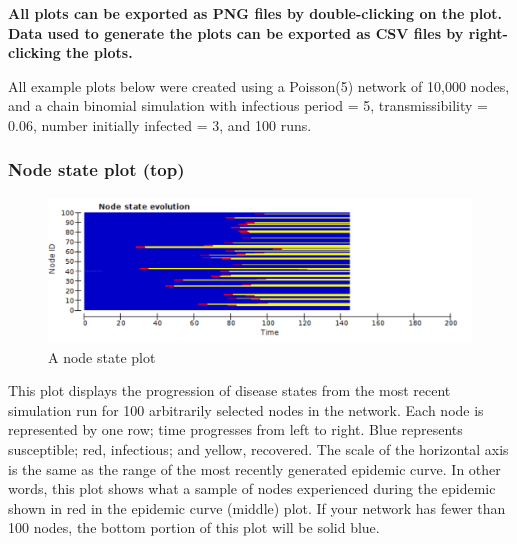 \documentclass{article}
\begin{document}
\textbf{All plots can be exported as PNG files by double-clicking on the plot.  Data used to generate the plots can be exported as CSV files by right-clicking the plots.}

All example plots below were created using a Poisson(5) network of 10,000 nodes, and a chain binomial simulation with infectious period = 5, transmissibility = 0.06, number initially infected = 3, and 100 runs.
\pagebreak
\subsubsection{Node state plot (top)}
\begin{figure}[h]
\begin{center}
\includegraphics[width = 6in]{states_example.pdf}
\caption{A node state plot}
\end{center}
\end{figure}
This plot displays the progression of disease states from the most recent simulation run for 100 arbitrarily selected nodes in the network. Each node is represented by one row; time progresses from left to right.  Blue represents susceptible; red, infectious; and yellow, recovered. The scale of the horizontal axis is the same as the range of the most recently generated epidemic curve.  In other words, this plot shows what a sample of nodes experienced during the epidemic shown in red in the epidemic curve (middle) plot.  If your network has fewer than 100 nodes, the bottom portion of this plot will be solid blue.
\end{document}
